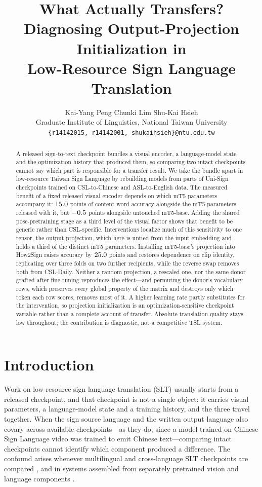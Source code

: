 \documentclass[11pt]{article}
\title{What Actually Transfers? Diagnosing Output-Projection Initialization in\\
Low-Resource Sign Language Translation}
\author{Kai-Yang Peng \quad Chunki Lim \quad Shu-Kai Hsieh \\
  Graduate Institute of Linguistics, National Taiwan University \\
  \texttt{\{r14142015, r14142001, shukaihsieh\}@ntu.edu.tw}}
\begin{document}
\maketitle

\begin{abstract}
A released sign-to-text checkpoint bundles a visual encoder, a language-model
state and the optimization history that produced them, so comparing two intact
checkpoints cannot say which part is responsible for a transfer result. We take
the bundle apart in low-resource Taiwan Sign Language by rebuilding models from
parts of Uni-Sign checkpoints trained on CSL-to-Chinese and ASL-to-English data.
The measured benefit of a fixed released visual encoder depends on which mT5
parameters accompany it: $15.0$ points of content-word
accuracy alongside the mT5 parameters released with it, but
$-0.5$ points alongside untouched mT5-base. Adding the
shared pose-pretraining stage as a third level of the visual factor shows that
benefit to be generic rather than CSL-specific. Interventions localize much of
this sensitivity to one tensor, the output projection, which here is untied from
the input embedding and holds a third of the distinct mT5 parameters. Installing
mT5-base's projection into How2Sign raises accuracy by
$25.0$ points and restores dependence on clip identity,
replicating over three folds on two further recipients, while the reverse swap
removes both from CSL-Daily. Neither a random projection, a rescaled one, nor the
same donor grafted after fine-tuning reproduces the effect---and permuting the
donor's vocabulary rows, which preserves every global property of the matrix and
destroys only which token each row scores, removes most of it. A higher learning
rate partly substitutes for the intervention, so projection initialization is an
optimization-sensitive checkpoint variable rather than a complete account of
transfer. Absolute translation quality stays low throughout; the contribution is
diagnostic, not a competitive TSL system.
\end{abstract}

\section{Introduction}

Work on low-resource sign language translation (SLT) usually starts from a
released checkpoint, and that checkpoint is not a single object: it carries
visual parameters, a language-model state and a training history, and the three
travel together. When the sign source language and the written output language
also covary across available checkpoints---as they do, since a model trained on
Chinese Sign Language video was trained to emit Chinese text---comparing intact
checkpoints cannot identify which component produced a difference. The confound
arises whenever multilingual and cross-language SLT checkpoints are compared
\citep{signet,mlslt,youtubeslfive}, and in systems assembled from separately
pretrained vision and language components \citep{sltunet,gfsltvlp,sign2gpt}.
\end{document}
